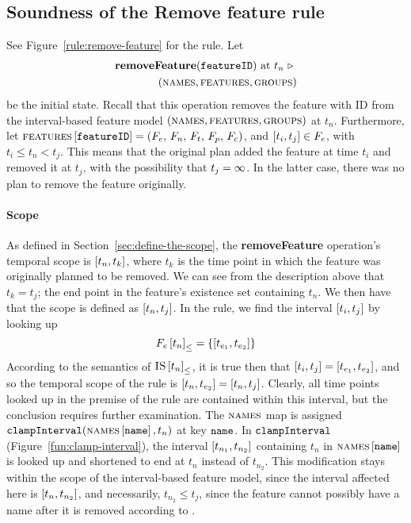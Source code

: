 \subsection{Soundness of the Remove feature rule}
\label{sub:soundness-of-the-remove-feature-rule}

See Figure~\vref{rule:remove-feature} for the  rule. 
Let 
\begin{equation*}
   \begin{split}
      \textbf{removeFeature}(\texttt{featureID})\text{ at } t_n
      \ \triangleright \  \\
   (\textsc{names}{}, \textsc{features}{}, \textsc{groups}{}{})
\end{split}
\end{equation*}
be the initial state. Recall that this operation removes the feature with ID  from the interval-based feature model $(\textsc{names}{}, \textsc{features}{}, \textsc{groups}{}{})$ at $t_n$. Furthermore, let $\textsc{features} \left[ \texttt{featureID} \right] = \left(F_e,\, F_n,\, F_t,\, F_p,\, F_c\right)$, and $\interval{t_i}{t_j} \in F_e$, with $t_i \leq t_n < t_j$. This means that the original plan added the feature at time $t_i$ and removed it at $t_j$, with the possibility that $t_j = \infty$. In the latter case, there was no plan to remove the feature originally.

\paragraph{Scope}
As defined in Section~\vref{sec:define-the-scope}, the \textbf{removeFeature} operation's temporal scope is $\interval{t_n}{t_k}$, where $t_k$ is the time point in which the feature was originally planned to be removed. We can see from the description above that $t_k = t_j$; the end point in the feature's existence set containing $t_n$. We then have that the scope is defined as $\interval{t_n}{t_j}$. In the rule, we find the interval $\interval{t_i}{t_j}$ by looking up
\begin{equation*}
   \containing{F_e}{t_n} = \set{\interval{t_{e_1}}{t_{e_2}}}
\end{equation*}
   According to the semantics of ${\textsc{IS} \left[ t_n \right]}_{\leq}$, it is true then that $\interval{t_i}{t_j} = \interval{t_{e_1}}{t_{e_2}}$, and so the temporal scope of the rule is $\interval{t_n}{t_{e_2}} = \interval{t_n}{t_j}$. Clearly, all time points looked up in the premise of the rule are contained within this interval, but the conclusion requires further examination. The $\textsc{names}{}$ map is assigned $\texttt{clampInterval}(\textsc{names} \left[ \texttt{name} \right], t_n)$ at key $\texttt{name}$. In $\texttt{clampInterval}$ (Figure~\vref{fun:clamp-interval}), the interval $\interval{t_{n_1}}{t_{n_2}}$ containing $t_n$ in $\textsc{names} \left[ \texttt{name} \right]$ is looked up and shortened to end at $t_n$ instead of $t_{n_2}$. This modification stays within the scope of the interval-based feature model, since the interval affected here is $\interval{t_n}{t_{n_2}}$, and necessarily, $t_{n_2} \leq t_j$, since the feature cannot possibly have a name after it is removed according to . 

